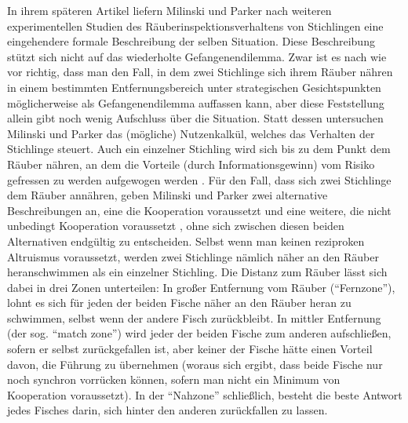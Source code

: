 \documentclass[12pt,a4paper,ngerman]{article}
\begin{document}
In ihrem späteren Artikel liefern Milinski und Parker nach weiteren
experimentellen Studien des Räuberinspektionsverhaltens von
Stichlingen eine eingehendere formale Beschreibung der selben
Situation. Diese Beschreibung stützt sich nicht auf das wiederholte
Gefangenendilemma. Zwar ist es nach wie vor richtig, dass man den
Fall, in dem zwei Stichlinge sich ihrem Räuber nähren in einem
bestimmten Entfernungsbereich unter strategischen Gesichtspunkten
möglicherweise als Gefangenendilemma auffassen kann, aber diese
Feststellung allein gibt noch wenig Aufschluss über die
Situation. Statt dessen untersuchen Milinski und Parker das (mögliche)
Nutzenkalkül, welches das Verhalten der Stichlinge steuert. Auch ein
einzelner Stichling wird sich bis zu dem Punkt dem Räuber nähren, an
dem die Vorteile (durch Informationsgewinn) vom Risiko gefressen zu
werden aufgewogen werden \cite[S. 1241/1242]{milinski-parker:1997}. Für
den Fall, dass sich zwei Stichlinge dem Räuber annähren, geben
Milinski und Parker zwei alternative Beschreibungen an, eine die
Kooperation voraussetzt \cite[S.  1242]{milinski-parker:1997} und eine
weitere, die nicht unbedingt Kooperation
voraussetzt \cite[S. 1242-1245]{milinski-parker:1997}, ohne sich
zwischen diesen beiden Alternativen endgültig zu entscheiden. Selbst
wenn man keinen reziproken Altruismus voraussetzt, werden zwei
Stichlinge nämlich näher an den Räuber heranschwimmen als ein
einzelner Stichling. Die Distanz zum Räuber lässt sich dabei in drei
Zonen unterteilen: In großer Entfernung vom Räuber ("`Fernzone"'),
lohnt es sich für jeden der beiden Fische näher an den Räuber heran zu
schwimmen, selbst wenn der andere Fisch zurückbleibt. In mittler
Entfernung (der sog. "`match zone"') wird jeder der beiden Fische zum
anderen aufschließen, sofern er selbst zurückgefallen ist, aber keiner
der Fische hätte einen Vorteil davon, die Führung zu übernehmen
(woraus sich ergibt, dass beide Fische nur noch synchron vorrücken
können, sofern man nicht ein Minimum von Kooperation voraussetzt). In
der "`Nahzone"' schließlich, besteht die beste Antwort jedes Fisches
darin, sich hinter den anderen zurückfallen zu lassen.
\end{document}
